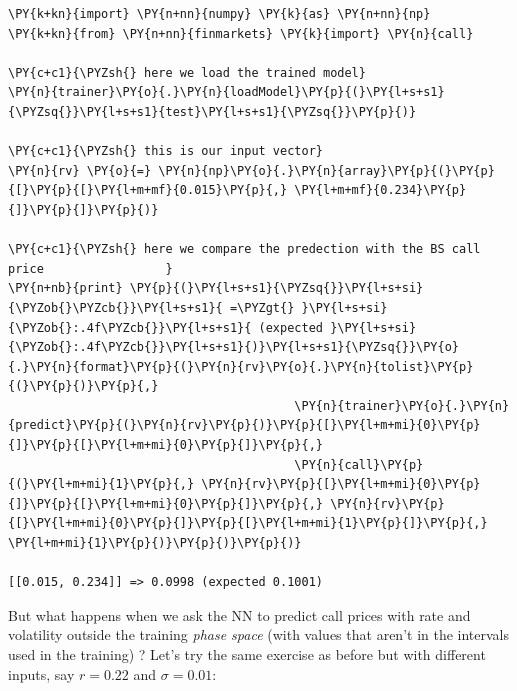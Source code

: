     \begin{tcolorbox}[breakable, size=fbox, boxrule=1pt, pad at break*=1mm,colback=cellbackground, colframe=cellborder]
\begin{Verbatim}[commandchars=\\\{\}]
\PY{k+kn}{import} \PY{n+nn}{numpy} \PY{k}{as} \PY{n+nn}{np}
\PY{k+kn}{from} \PY{n+nn}{finmarkets} \PY{k}{import} \PY{n}{call}

\PY{c+c1}{\PYZsh{} here we load the trained model}
\PY{n}{trainer}\PY{o}{.}\PY{n}{loadModel}\PY{p}{(}\PY{l+s+s1}{\PYZsq{}}\PY{l+s+s1}{test}\PY{l+s+s1}{\PYZsq{}}\PY{p}{)}

\PY{c+c1}{\PYZsh{} this is our input vector}
\PY{n}{rv} \PY{o}{=} \PY{n}{np}\PY{o}{.}\PY{n}{array}\PY{p}{(}\PY{p}{[}\PY{p}{[}\PY{l+m+mf}{0.015}\PY{p}{,} \PY{l+m+mf}{0.234}\PY{p}{]}\PY{p}{]}\PY{p}{)}
          
\PY{c+c1}{\PYZsh{} here we compare the predection with the BS call price                 }
\PY{n+nb}{print} \PY{p}{(}\PY{l+s+s1}{\PYZsq{}}\PY{l+s+si}{\PYZob{}\PYZcb{}}\PY{l+s+s1}{ =\PYZgt{} }\PY{l+s+si}{\PYZob{}:.4f\PYZcb{}}\PY{l+s+s1}{ (expected }\PY{l+s+si}{\PYZob{}:.4f\PYZcb{}}\PY{l+s+s1}{)}\PY{l+s+s1}{\PYZsq{}}\PY{o}{.}\PY{n}{format}\PY{p}{(}\PY{n}{rv}\PY{o}{.}\PY{n}{tolist}\PY{p}{(}\PY{p}{)}\PY{p}{,} 
                                        \PY{n}{trainer}\PY{o}{.}\PY{n}{predict}\PY{p}{(}\PY{n}{rv}\PY{p}{)}\PY{p}{[}\PY{l+m+mi}{0}\PY{p}{]}\PY{p}{[}\PY{l+m+mi}{0}\PY{p}{]}\PY{p}{,} 
                                        \PY{n}{call}\PY{p}{(}\PY{l+m+mi}{1}\PY{p}{,} \PY{n}{rv}\PY{p}{[}\PY{l+m+mi}{0}\PY{p}{]}\PY{p}{[}\PY{l+m+mi}{0}\PY{p}{]}\PY{p}{,} \PY{n}{rv}\PY{p}{[}\PY{l+m+mi}{0}\PY{p}{]}\PY{p}{[}\PY{l+m+mi}{1}\PY{p}{]}\PY{p}{,} \PY{l+m+mi}{1}\PY{p}{)}\PY{p}{)}\PY{p}{)}

[[0.015, 0.234]] => 0.0998 (expected 0.1001)
    \end{Verbatim}
\end{tcolorbox}

    But what happens when we ask the NN to predict call prices with rate and
volatility outside the training \emph{phase space} (with values that
aren't in the intervals used in the training) ? Let's try the same
exercise as before but with different inputs, say \(r = 0.22\) and
\(\sigma = 0.01\):

